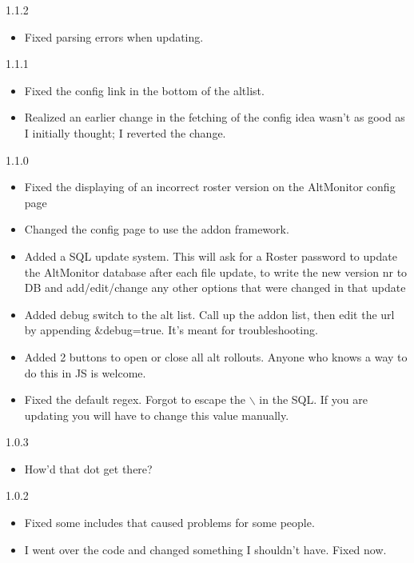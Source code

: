 \documentclass[12pt, a4paper]{article}
\begin{document}
\begin{description}
\item{1.1.2}
\begin{itemize}
\item Fixed parsing errors when updating.
\end{itemize}

\item{1.1.1}
\begin{itemize}
\item Fixed the config link in the bottom of the altlist.
\item Realized an earlier change in the fetching of the config idea wasn't as good
   as I initially thought; I reverted the change.
\end{itemize}

\item{1.1.0}
\begin{itemize}
\item Fixed the displaying of an incorrect roster version on the AltMonitor config
   page
\item Changed the config page to use the addon framework.
\item Added a SQL update system. This will ask for a Roster password to update the
   AltMonitor database after each file update, to write the new version nr to
   DB and add/edit/change any other options that were changed in that update
\item Added debug switch to the alt list. Call up the addon list, then edit the
   url by appending \&debug=true. It's meant for troubleshooting.
\item Added 2 buttons to open or close all alt rollouts. Anyone who knows a way to
   do this in JS is welcome.
\item Fixed the default regex. Forgot to escape the $\backslash$ in the SQL. If
   you are updating you will have to change this value manually.
\end{itemize}

\item{1.0.3}
\begin{itemize}
\item How'd that dot get there?
\end{itemize}

\item{1.0.2}
\begin{itemize}
\item Fixed some includes that caused problems for some people.
\item I went over the code and changed something I shouldn't have. Fixed now.
\end{itemize}


\end{description}
\end{document}
